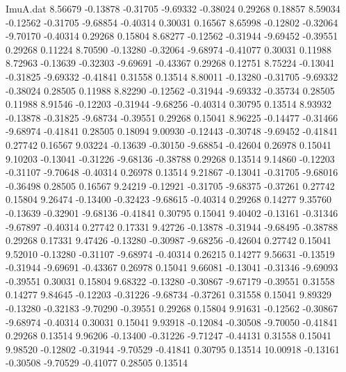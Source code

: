 \begin{filecontents}{ImuA.dat}
   8.56679   -0.13878   -0.31705   -9.69332   -0.38024    0.29268    0.18857
   8.59034   -0.12562   -0.31705   -9.68854   -0.40314    0.30031    0.16567
   8.65998   -0.12802   -0.32064   -9.70170   -0.40314    0.29268    0.15804
   8.68277   -0.12562   -0.31944   -9.69452   -0.39551    0.29268    0.11224
   8.70590   -0.13280   -0.32064   -9.68974   -0.41077    0.30031    0.11988
   8.72963   -0.13639   -0.32303   -9.69691   -0.43367    0.29268    0.12751
   8.75224   -0.13041   -0.31825   -9.69332   -0.41841    0.31558    0.13514
   8.80011   -0.13280   -0.31705   -9.69332   -0.38024    0.28505    0.11988
   8.82290   -0.12562   -0.31944   -9.69332   -0.35734    0.28505    0.11988
   8.91546   -0.12203   -0.31944   -9.68256   -0.40314    0.30795    0.13514
   8.93932   -0.13878   -0.31825   -9.68734   -0.39551    0.29268    0.15041
   8.96225   -0.14477   -0.31466   -9.68974   -0.41841    0.28505    0.18094
   9.00930   -0.12443   -0.30748   -9.69452   -0.41841    0.27742    0.16567
   9.03224   -0.13639   -0.30150   -9.68854   -0.42604    0.26978    0.15041
   9.10203   -0.13041   -0.31226   -9.68136   -0.38788    0.29268    0.13514
   9.14860   -0.12203   -0.31107   -9.70648   -0.40314    0.26978    0.13514
   9.21867   -0.13041   -0.31705   -9.68016   -0.36498    0.28505    0.16567
   9.24219   -0.12921   -0.31705   -9.68375   -0.37261    0.27742    0.15804
   9.26474   -0.13400   -0.32423   -9.68615   -0.40314    0.29268    0.14277
   9.35760   -0.13639   -0.32901   -9.68136   -0.41841    0.30795    0.15041
   9.40402   -0.13161   -0.31346   -9.67897   -0.40314    0.27742    0.17331
   9.42726   -0.13878   -0.31944   -9.68495   -0.38788    0.29268    0.17331
   9.47426   -0.13280   -0.30987   -9.68256   -0.42604    0.27742    0.15041
   9.52010   -0.13280   -0.31107   -9.68974   -0.40314    0.26215    0.14277
   9.56631   -0.13519   -0.31944   -9.69691   -0.43367    0.26978    0.15041
   9.66081   -0.13041   -0.31346   -9.69093   -0.39551    0.30031    0.15804
   9.68322   -0.13280   -0.30867   -9.67179   -0.39551    0.31558    0.14277
   9.84645   -0.12203   -0.31226   -9.68734   -0.37261    0.31558    0.15041
   9.89329   -0.13280   -0.32183   -9.70290   -0.39551    0.29268    0.15804
   9.91631   -0.12562   -0.30867   -9.68974   -0.40314    0.30031    0.15041
   9.93918   -0.12084   -0.30508   -9.70050   -0.41841    0.29268    0.13514
   9.96206   -0.13400   -0.31226   -9.71247   -0.44131    0.31558    0.15041
   9.98520   -0.12802   -0.31944   -9.70529   -0.41841    0.30795    0.13514
  10.00918   -0.13161   -0.30508   -9.70529   -0.41077    0.28505    0.13514

\end{filecontents}
